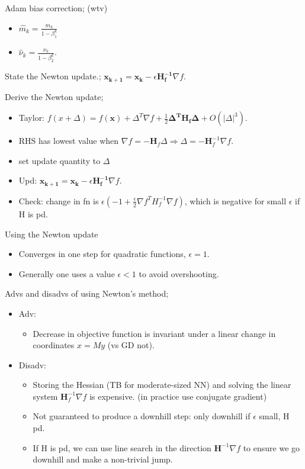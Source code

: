 \documentclass{article}
\begin{document}
Adam bias correction; (wtv) \begin{itemize}
	\item $\hat{m}_k = \frac{m_k}{1-\beta^k_1}$
	\item $\hat{\nu}_k = \frac{\nu_k}{1-\beta^k_2}$.
\end{itemize}

State the Newton update.; $\mathbf{x_{k+1} = x_k} - \epsilon\mathbf{H^{-1}_f}\nabla f$.

Derive the Newton update; \begin{itemize}
	\item Taylor: $f(x+\Delta) = f(\mathbf{x}) + \Delta^T\nabla f + \frac{1}{2}\mathbf{\Delta^T H_f \Delta} + O(|\Delta|^3)$.
	\item RHS has lowest value when $\nabla f = -\mathbf{H}_f\Delta \Rightarrow \Delta = -\mathbf{H}^{-1}_f \nabla f$.
	\item set update quantity to $\Delta$
	\item Upd: $\mathbf{x_{k+1} = x_k} - \epsilon\mathbf{H^{-1}_f}\nabla f$.
	\item Check: change in fn is $\epsilon (-1+\frac{\epsilon}{2}\nabla f^T H^{-1}_f\nabla f)$, which is negative for small $\epsilon$ if H is pd.
\end{itemize}

Using the Newton update \begin{itemize}
	\item Converges in one step for quadratic functions, $\epsilon = 1$.
	\item Generally one uses a value $\epsilon < 1$ to avoid overshooting.
\end{itemize}

Advs and disadvs of using Newton's method; \begin{itemize}
	\item Adv: \begin{itemize}
	\item Decrease in objective function is invariant under a linear change in coordinates $x=My$ (vs GD not).
\end{itemize}
\item Disadv: \begin{itemize}
	\item Storing the Hessian (TB for moderate-sized NN) and solving the linear system $\mathbf{H}_f^{-1}\nabla f$ is expensive. (in practice use conjugate gradient)
	\item Not guaranteed to produce a downhill step: only downhill if $\epsilon$ small, H pd.
	\item If H is pd, we can use line search in the direction $\mathbf{H}^{-1}\nabla f$ to ensure we go downhill and make a non-trivial jump.
\end{itemize}
\end{itemize}
\end{document}
